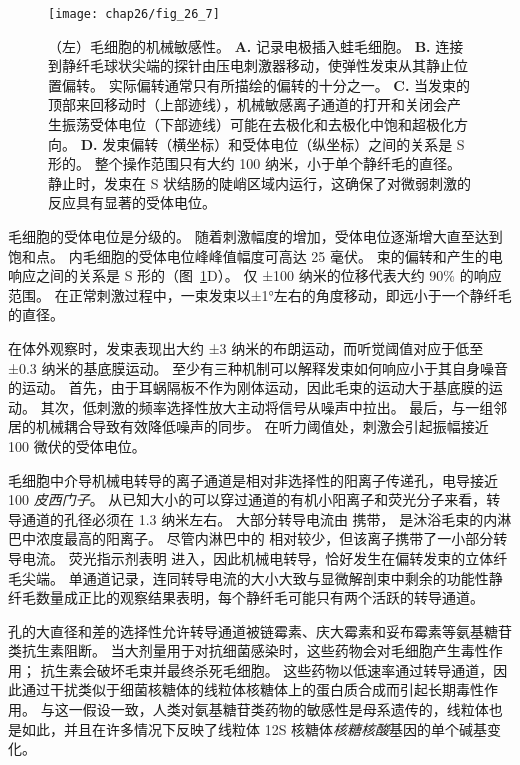 \begin{figure}[htbp]
	\centering
	\texttt{[image: chap26/fig\_26\_7]}
	\caption{（左）毛细胞的机械敏感性。
		\textbf{A.} 记录电极插入蛙毛细胞。
		\textbf{B.} 连接到静纤毛球状尖端的探针由压电刺激器移动，使弹性发束从其静止位置偏转。
		实际偏转通常只有所描绘的偏转的十分之一。
		\textbf{C.} 当发束的顶部来回移动时（上部迹线），机械敏感离子通道的打开和关闭会产生振荡受体电位（下部迹线）可能在去极化和去极化中饱和超极化方向。
		\textbf{D.} 发束偏转（横坐标）和受体电位（纵坐标）之间的关系是 S 形的。
		整个操作范围只有大约 100 纳米，小于单个静纤毛的直径。
		静止时，发束在 S 状结肠的陡峭区域内运行，这确保了对微弱刺激的反应具有显著的受体电位。}
	\label{fig:26_7}
\end{figure}


毛细胞的受体电位是分级的。
随着刺激幅度的增加，受体电位逐渐增大直至达到饱和点。
内毛细胞的受体电位峰峰值幅度可高达 25 毫伏。
束的偏转和产生的电响应之间的关系是 S 形的（图~\ref{fig:26_7}D）。
仅 ±100 纳米的位移代表大约 90\% 的响应范围。
在正常刺激过程中，一束发束以±1°左右的角度移动，即远小于一个静纤毛的直径。


在体外观察时，发束表现出大约 ±3 纳米的布朗运动，而听觉阈值对应于低至 ±0.3 纳米的基底膜运动。
至少有三种机制可以解释发束如何响应小于其自身噪音的运动。
首先，由于耳蜗隔板不作为刚体运动，因此毛束的运动大于基底膜的运动。
其次，低刺激的频率选择性放大主动将信号从噪声中拉出。
最后，与一组邻居的机械耦合导致有效降低噪声的同步。 
在听力阈值处，刺激会引起振幅接近 100 微伏的受体电位。


毛细胞中介导机械电转导的离子通道是相对非选择性的阳离子传递孔，电导接近 100 \textit{皮西门子}。
从已知大小的可以穿过通道的有机小阳离子和荧光分子来看，转导通道的孔径必须在 1.3 纳米左右。
大部分转导电流由  携带， 是沐浴毛束的内淋巴中浓度最高的阳离子。
尽管内淋巴中的  相对较少，但该离子携带了一小部分转导电流。
荧光指示剂表明  进入，因此机械电转导，恰好发生在偏转发束的立体纤毛尖端。
单通道记录，连同转导电流的大小大致与显微解剖束中剩余的功能性静纤毛数量成正比的观察结果表明，每个静纤毛可能只有两个活跃的转导通道。


孔的大直径和差的选择性允许转导通道被链霉素、庆大霉素和妥布霉素等氨基糖苷类抗生素阻断。
当大剂量用于对抗细菌感染时，这些药物会对毛细胞产生毒性作用；
抗生素会破坏毛束并最终杀死毛细胞。
这些药物以低速率通过转导通道，因此通过干扰类似于细菌核糖体的线粒体核糖体上的蛋白质合成而引起长期毒性作用。
与这一假设一致，人类对氨基糖苷类药物的敏感性是母系遗传的，线粒体也是如此，并且在许多情况下反映了线粒体 12S 核糖体\textit{核糖核酸}基因的单个碱基变化。



